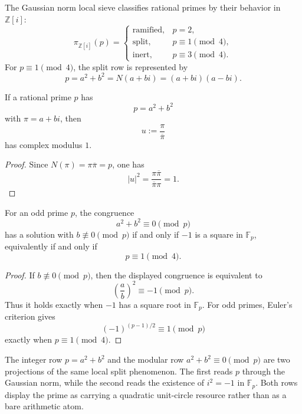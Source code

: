 \begin{definition}
\label{def:rh-gaussian-norm-local-sieve}
The Gaussian norm local sieve classifies rational primes by their
behavior in $\mathbb Z[i]$:
$$
\pi_{\mathbb Z[i]}(p)
=
\begin{cases}
\mathrm{ramified},&p=2,\\
\mathrm{split},&p\equiv1\pmod4,\\
\mathrm{inert},&p\equiv3\pmod4.
\end{cases}
$$
For $p\equiv1\pmod4$, the split row is represented by
$$
p=a^2+b^2=N(a+bi)=(a+bi)(a-bi).
$$
\end{definition}

\begin{theorem}
\label{thm:rh-split-gaussian-primes-carry-unit-circle-quotient}
If a rational prime $p$ has
$$
p=a^2+b^2
$$
with $\pi=a+bi$, then
$$
u:=\frac{\pi}{\overline\pi}
$$
has complex modulus $1$.
\end{theorem}

\begin{proof}
Since $N(\pi)=\pi\overline\pi=p$, one has
$$
|u|^2
=
\frac{\pi\overline\pi}{\overline\pi\pi}
=1.
$$
\end{proof}

\begin{theorem}
\label{thm:rh-modular-two-square-row-detects-split-type}
For an odd prime $p$, the congruence
$$
a^2+b^2\equiv0\pmod p
$$
has a solution with $b\not\equiv0\pmod p$ if and only if $-1$ is a
square in $\mathbb F_p$, equivalently if and only if
$$
p\equiv1\pmod4.
$$
\end{theorem}

\begin{proof}
If $b\not\equiv0\pmod p$, then the displayed congruence is equivalent
to
$$
\left(\frac ab\right)^2\equiv-1\pmod p.
$$
Thus it holds exactly when $-1$ has a square root in $\mathbb F_p$.
For odd primes, Euler's criterion gives
$$
(-1)^{(p-1)/2}\equiv1\pmod p
$$
exactly when $p\equiv1\pmod4$.
\end{proof}

\begin{principle}
\label{prin:rh-two-square-data-local-unit-sieve}
The integer row $p=a^2+b^2$ and the modular row
$a^2+b^2\equiv0\pmod p$ are two projections of the same local split
phenomenon.  The first reads $p$ through the Gaussian norm, while the
second reads the existence of $i^2=-1$ in $\mathbb F_p$.  Both rows
display the prime as carrying a quadratic unit-circle resource rather
than as a bare arithmetic atom.
\end{principle}

